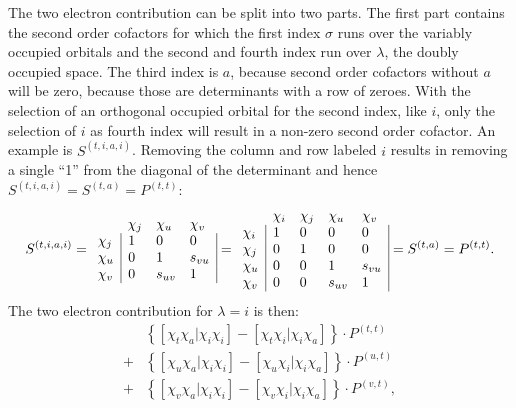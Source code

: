 The two electron contribution can be split into two parts. The first part contains the second order cofactors for which the first index $\sigma$ runs over the variably occupied orbitals and the second and fourth index run over $\lambda$, the doubly occupied space. The third index is $a$, because second order cofactors without $a$ will be zero, because those are determinants with a row of zeroes. With the selection of an orthogonal occupied orbital for the second index, like $i$, only the selection of $i$ as fourth index will result in a non-zero second order cofactor. An example is $S^{(t,i,a,i)}$. Removing the column and row labeled $i$ results in removing a single ``1'' from the diagonal of the determinant and hence $S^{(t,i,a,i)}=S^{(t,a)}=P^{(t,t)}$:
\begin{equation}
S^{(t,i,a,i)}=
\begin{array}{llll}
 &  \chi_j & \chi_u & \chi_v \\
 \chi_j & \multicolumn{1}{|l}{ 1 } & 0 & \multicolumn{1}{l|}{ 0 } \\
 \chi_u & \multicolumn{1}{|l}{ 0 } & 1 & \multicolumn{1}{l|}{s_{vu}} \\
 \chi_v & \multicolumn{1}{|l}{ 0 } & s_{uv} & \multicolumn{1}{l|}{1}
\end{array}=
\begin{array}{lllll}
 &  \chi_i & \chi_j & \chi_u & \chi_v \\
 \chi_i & \multicolumn{1}{|l}{ 1 } & 0 & 0 & \multicolumn{1}{l|}{ 0 } \\
 \chi_j & \multicolumn{1}{|l}{ 0 } & 1 & 0 & \multicolumn{1}{l|}{ 0 } \\
 \chi_u & \multicolumn{1}{|l}{ 0 } & 0 & 1 & \multicolumn{1}{l|}{s_{vu}} \\
 \chi_v & \multicolumn{1}{|l}{ 0 } & 0 & s_{uv} & \multicolumn{1}{l|}{1}
\end{array}=
S^{(t,a)}=P^{(t,t)}.
\label{ch2.eq.stiai-sta}
\end{equation}
The two electron contribution for $\lambda = i$ is then:
\begin{equation}
\begin{split}
&\left\{ \left[ \chi_t \chi_a | \chi_i \chi_i \right] - \left[ \chi_t \chi_i | \chi_i \chi_a \right] \right\} \cdot P^{(t,t)}\\
+&\left\{ \left[ \chi_u \chi_a | \chi_i \chi_i \right] - \left[ \chi_u \chi_i | \chi_i \chi_a \right] \right\} \cdot P^{(u,t)}\\
+&\left\{ \left[ \chi_v \chi_a | \chi_i \chi_i \right] - \left[ \chi_v \chi_i | \chi_i \chi_a \right] \right\} \cdot P^{(v,t)},
\end{split}
\label{ch2.eq.ta_i2}
\end{equation} 
